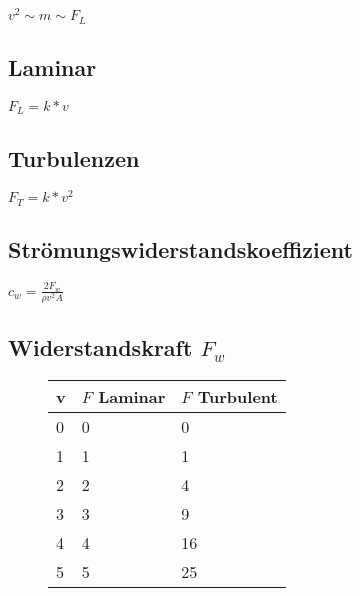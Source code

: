 \begin{multicols}{2}
	

\(v^2 \sim m \sim F_L\)

\subsection{Laminar}

\(F_L = k * v\)

\subsection{Turbulenzen}

\(F_T = k * v^2 \)

\subsection{Strömungswiderstandskoeffizient}

\(c_w = \frac{2F_w}{\rho v^2 A} \)

\subsection{Widerstandskraft \(F_w \)}

\begin{figure}
	\centering
	\begin{tabular}{|l|l|l|}
		\hline
		\textbf{v} & \textbf{\(F\) Laminar} & \textbf{\(F\) Turbulent} \\
		\hline
		0 & 0 & 0\\ \hline
		1 & 1 & 1\\ \hline
		2 & 2 & 4\\ \hline
		3 & 3 & 9\\ \hline
		4 & 4 & 16\\ \hline
		5 & 5 & 25\\ \hline
		
	\end{tabular}
	\caption{\label{fig:tablegraph}}
\end{figure}

\end{multicols}
